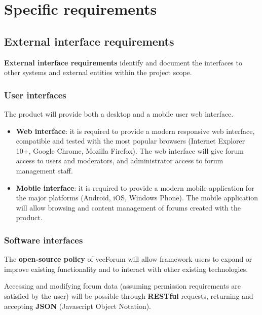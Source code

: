 \documentclass[12pt]{report}
\renewcommand\emph{\textbf}
\begin{document}
            \section{Specific requirements}

                \subsection{External interface requirements}

                    \emph{External interface requirements} identify and document the interfaces to other systems and external entities within the project scope.

                    \subsubsection{User interfaces}
                        The product will provide both a desktop and a mobile user web interface.

                        \begin{itemize}
                            \item \emph{Web interface}: it is required to provide a modern responsive web interface, compatible and tested with the most popular browsers (Internet Explorer 10+, Google Chrome, Mozilla Firefox). The web interface will give forum access to users and moderators, and administrator access to forum management staff.
                            \item \emph{Mobile interface}: it is required to provide a modern mobile application for the major platforms (Android, iOS, Windows Phone). The mobile application will allow browsing and content management of forums created with the product.
                        \end{itemize}

                    \subsubsection{Software interfaces}
                        The \emph{open-source policy} of veeForum will allow framework users to expand or improve existing functionality and to interact with other existing technologies.

                        Accessing and modifying forum data (assuming permission requirements are satisfied by the user) will be possible through \emph{RESTful} requests, returning and accepting \emph{JSON} (Javascript Object Notation).
\end{document}
